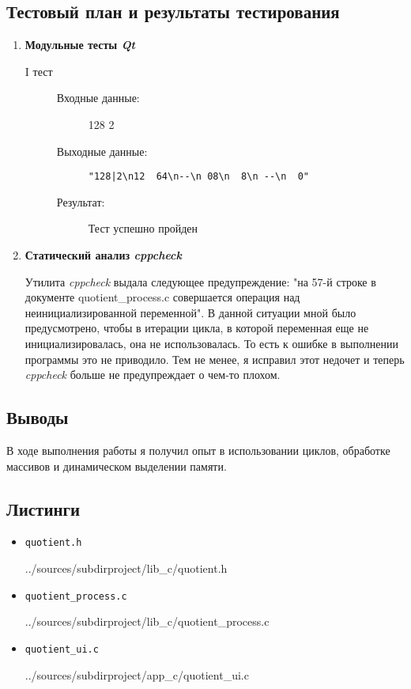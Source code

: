 \documentclass[12pt,a4paper]{report}
\begin{document}
\subsection{Тестовый план и результаты тестирования}
\hspace{\parindent}
\begin{enumerate}
\item \textbf{Модульные тесты \textit{Qt}}

\begin{description}
\item[I тест]
\hspace{\parindent}
\begin{flushleft}
\begin{description}
\item[Входные данные:] 128 2
\item[Выходные данные:] \verb/"128|2\n12  64\n--\n 08\n  8\n --\n  0"/
\item[Результат:] Тест успешно пройден
\end{description}
\end{flushleft}
\end{description}

\item \textbf{Статический анализ \textit{cppcheck}}

Утилита \textit{cppcheck} выдала следующее предупреждение: "на 57-й строке в документе quotient\_process.c совершается операция над неинициализированной переменной".
В данной ситуации мной было предусмотрено, чтобы в итерации цикла, в которой переменная еще не инициализировалась, она не использовалась. То есть к ошибке в выполнении программы это не приводило. Тем не менее, я исправил этот недочет и теперь \textit{cppcheck} больше не предупреждает о чем-то плохом.
\end{enumerate}
\subsection{Выводы}
\hspace{\parindent}
В ходе выполнения работы я получил опыт в использовании циклов, обработке массивов и динамическом выделении памяти.
\subsection*{Листинги}
\begin{itemize}
\item[] \verb-quotient.h-

{../sources/subdirproject/lib_c/quotient.h}
\item[] \verb-quotient_process.c-

{../sources/subdirproject/lib_c/quotient_process.c}
\item[] \verb-quotient_ui.c-

{../sources/subdirproject/app_c/quotient_ui.c}
\end{itemize}
\end{document}

